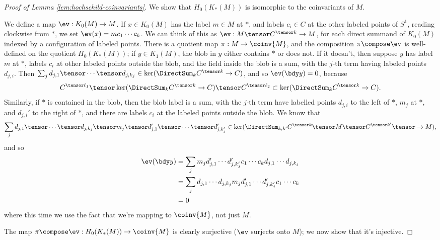 \begin{proof}[Proof of Lemma \ref{lem:hochschild-coinvariants}]
We show that $H_0(K_*(M))$ is isomorphic to the coinvariants of $M$.

We define a map $\ev: K_0(M) \to M$. If $x \in K_0(M)$ has the label $m \in M$ at $*$, and labels $c_i \in C$ at the other labeled points of $S^1$, reading clockwise from $*$,
we set $\ev(x) = m c_1 \cdots c_k$. We can think of this as $\ev : M \tensor C^{\tensor k} \to M$, for each direct summand of $K_0(M)$ indexed by a configuration of labeled points.
There is a quotient map $\pi: M \to \coinv{M}$, and the composition $\pi \compose \ev$ is well-defined on the quotient $H_0(K_*(M))$; if $y \in K_1(M)$, the blob in $y$ either contains $*$ or does not. If it doesn't, then
suppose $y$ has label $m$ at $*$, labels $c_i$ at other labeled points outside the blob, and the field inside the blob is a sum, with the $j$-th term having
labeled points $d_{j,i}$. Then $\sum_j d_{j,1} \tensor \cdots \tensor d_{j,k_j} \in \ker(\DirectSum_k C^{\tensor k} \to C)$, and so
$\ev(\bdy y) = 0$, because $$C^{\tensor \ell_1} \tensor \ker(\DirectSum_k C^{\tensor k} \to C) \tensor C^{\tensor \ell_2} \subset \ker(\DirectSum_k C^{\tensor k} \to C).$$
Similarly, if $*$ is contained in the blob, then the blob label is a sum, with the $j$-th term have labelled points $d_{j,i}$ to the left of $*$, $m_j$ at $*$, and $d_{j,i}'$ to the right of $*$,
and there are labels $c_i$ at the labeled points outside the blob. We know that
$$\sum_j d_{j,1} \tensor \cdots \tensor d_{j,k_j} \tensor m_j \tensor d_{j,1}' \tensor \cdots \tensor d_{j,k'_j}' \in \ker(\DirectSum_{k,k'} C^{\tensor k} \tensor M \tensor C^{\tensor k'} \tensor \to M),$$
and so
\begin{align*}
\ev(\bdy y) & = \sum_j m_j d_{j,1}' \cdots d_{j,k'_j}' c_1 \cdots c_k d_{j,1} \cdots d_{j,k_j} \\
            & = \sum_j d_{j,1} \cdots d_{j,k_j} m_j d_{j,1}' \cdots d_{j,k'_j}' c_1 \cdots c_k \\
            & = 0
\end{align*}
where this time we use the fact that we're mapping to $\coinv{M}$, not just $M$.

The map $\pi \compose \ev: H_0(K_*(M)) \to \coinv{M}$ is clearly surjective ($\ev$ surjects onto $M$); we now show that it's injective. \todo{}
\end{proof}
